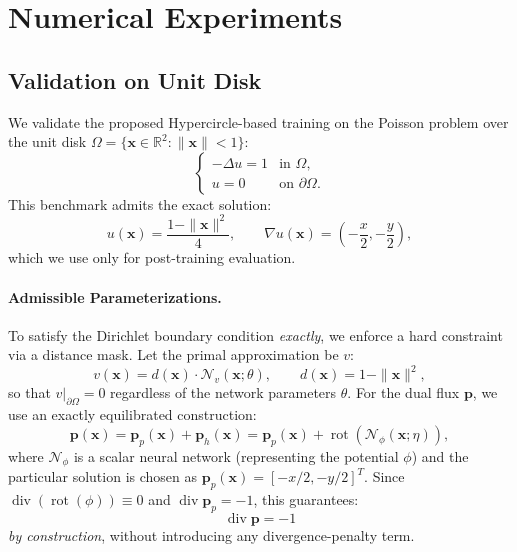 \documentclass[12pt, a4paper]{article}
\DeclareMathOperator{\rot}{rot}
\DeclareMathOperator{\divg}{div}
\begin{document}
\section{Numerical Experiments}

\subsection{Validation on Unit Disk}
We validate the proposed Hypercircle-based training on the Poisson problem over the unit disk $\Omega=\{\mathbf{x} \in \mathbb{R}^2 : \|\mathbf{x}\| < 1\}$:
\begin{equation}
    \begin{cases}
    -\Delta u = 1 & \text{in } \Omega, \\
    u = 0 & \text{on } \partial \Omega.
    \end{cases}
\end{equation}
This benchmark admits the exact solution:
\begin{equation}
    u(\mathbf{x}) = \frac{1 - \|\mathbf{x}\|^2}{4}, \qquad \nabla u(\mathbf{x}) = \left( -\frac{x}{2}, -\frac{y}{2} \right),
\end{equation}
which we use only for post-training evaluation.

\paragraph{Admissible Parameterizations.}
To satisfy the Dirichlet boundary condition \emph{exactly}, we enforce a hard constraint via a distance mask. Let the primal approximation be $v$:
\begin{equation}
    v(\mathbf{x}) = d(\mathbf{x}) \cdot \mathcal{N}_v(\mathbf{x}; \theta), \qquad d(\mathbf{x}) = 1 - \|\mathbf{x}\|^2,
\end{equation}
so that $v|_{\partial\Omega} = 0$ regardless of the network parameters $\theta$.
For the dual flux $\mathbf{p}$, we use an exactly equilibrated construction:
\begin{equation}
    \mathbf{p}(\mathbf{x}) = \mathbf{p}_p(\mathbf{x}) + \mathbf{p}_h(\mathbf{x}) = \mathbf{p}_p(\mathbf{x}) + \rot(\mathcal{N}_\phi(\mathbf{x}; \eta)),
\end{equation}
where $\mathcal{N}_\phi$ is a scalar neural network (representing the potential $\phi$) and the particular solution is chosen as $\mathbf{p}_p(\mathbf{x}) = [-x/2, -y/2]^T$.
Since $\divg(\rot(\phi)) \equiv 0$ and $\divg \mathbf{p}_p = -1$, this guarantees:
\begin{equation}
    \divg \mathbf{p} = -1
\end{equation}
\emph{by construction}, without introducing any divergence-penalty term.
\end{document}
